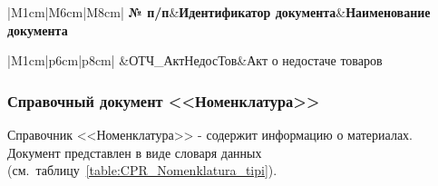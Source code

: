 

\begin{table}[h!]
    \centering

    \footnotesize

    \caption{Каталог отчётных документов}

    \label{table:OTC_katalog}

    \begin{tabular}{|M{1cm}|M{6cm}|M{8cm}|} 
        \hline
        \textbf{№ п/п}&\textbf{Идентификатор документа}&\textbf{Наименование документа}\\ \hline
    \end{tabular}

    \begin{tabular}{|M{1cm}|p{6cm}|p{8cm}|} 
        &ОТЧ\_АктНедосТов&Акт о недостаче товаров\\ \hline
    \end{tabular}
\end{table}


\newpage

\subsubsection{Справочный документ <<Номенклатура>>}

Справочник <<Номенклатура>> - содержит информацию о материалах.
Документ представлен в виде словаря данных (см.~таблицу~\ref{table:CPR_Nomenklatura_tipi}).

